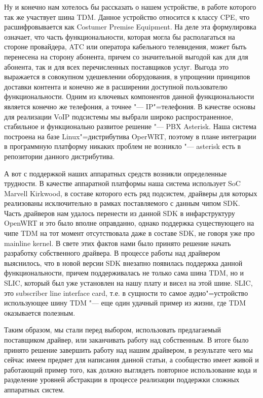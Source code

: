 \documentclass[10pt, a5paper]{article}
\begin{document}
Ну и конечно нам хотелось бы рассказать о нашем устройстве, в работе
которого так же участвует шина TDM. Данное устройство относится к классу
CPE, что расшифровывается как Costumer Premise Equipment. На деле эта
формулировка означает, что часть функциональности, которая могла бы располагаться
на стороне провайдера, ATC или оператора кабельного телевидения, может
быть перенесена на сторону абонента, причем со значительной выгодой как
для для абонента, так и для всех перечисленных поставщиков услуг. Выгода
это выражается в совокупном удешевлении оборудования, в упрощении
принципов доставки контента и конечно же в расширении доступной
пользователю функциональности. Одним из ключевых компонентов данной
функциональности является конечно же телефония, а точнее "--- IP"=телефония. В
качестве основы для реализации VoIP подсистемы мы выбрали широко
распространенное, стабильное и функционально развитое решение "--- PBX
Asterisk. Наша система построена на базе Linux"=дистрибутива OperWRT,
поэтому в плане интеграции в программную платформу никаких проблем не
возникло "--- asterisk есть в репозитории данного дистрибутива.

А вот с поддержкой наших аппаратных средств возникли определенные
трудности. В качестве аппаратной платформы наша система использует SoC
Marvell Kirkwood, в составе которого есть ряд подсистем, драйверы для
которых реализованы исключительно в рамках поставляемого с данным чипом
SDK. Часть драйверов нам удалось перенести из данной SDK в инфарструктуру
OpenWRT и это было вполне оправданно, однако поддержка существующего на
чипе TDM на тот момент отсутствовала даже в составе SDK, не говоря уже про
mainline kernel. В свете этих фактов нами было принято решение начать
разработку собственного драйвера. В процессе работы над драйвером
выяснилось, что в новой версии SDK внезапно появилась поддержка данной
функциональности, причем поддерживалась не только сама шина TDM, но и SLIC,
который был уже установлен на нашу плату и висел на этой шине. SLIC, это
subscriber line interface card, т.е. в сущности то самое аудио"=устройство
использующее шину TDM "--- еще один удачный пример из жизни, где TDM
оказывается полезным.

Таким образом, мы стали перед выбором, использовать предлагаемый
поставщиком драйвер, или заканчивать работу над собственным. В итоге было
принято решение завершить работу над нашим драйвером, в результате чего мы
сейчас имеем предмет для написания данной статьи, а сообщество имеет живой
и работающий пример того, как должно выглядеть повторное использование
кода и разделение уровней абстракции в процессе реализации поддержки
сложных аппаратных систем.
\end{document}
